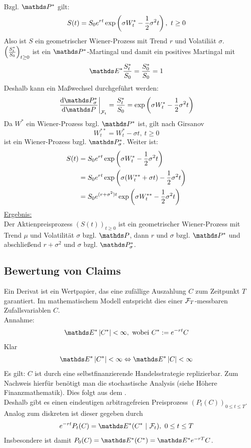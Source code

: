 \\
Bzgl. $\Pw^*$ gilt:
\[
S(t)=S_0 e^{r t}\exp\left( \sigma W_t^*-\frac{1}{2}\sigma^2t\right),~t\ge 0
\]
Also ist $S$ ein geometrischer Wiener-Prozess mit Trend $r$ und Volatiliät $\sigma$.\\
$\left( \frac{S_t^*}{S_0}\right)_{t\ge0}$ ist ein $\Pw^*$-Martingal und damit ein positives Martingal mit
\[
\E^*\frac{S_t^*}{S_0}=\frac{S_0^*}{S_0}=1
\]
Deshalb kann ein Maßwechsel durchgeführt werden:
\[
\left.\difff{\Pw_\sigma^*}{\Pw}\right|_{\F_t}=\frac{S_t^*}{S_0}=\exp\enbrace{\sigma W_t^*-\frac{1}{2}\sigma^2t}
\]
Da $W^*$ ein Wiener-Prozess bzgl. $\Pw^*$ ist, gilt nach Girsanov
\[
W_t^{**}=W_t^*-\sigma t,~t\ge0
\]
ist ein Wiener-Prozess bzgl. $\Pw_\sigma^*$.
Weiter ist:
\begin{equation*}
\begin{aligned}
	S(t)&= S_0 e^{r t}\exp\left( \sigma W_t^*-\frac{1}{2}\sigma^2t\right)\\
	&= S_0 e^{rt}\exp\left( \sigma(W_t^{**}+\sigma t)-\frac{1}{2}\sigma^2t\right)\\
	&= S_0 e^{(r+\sigma^2)t}\exp\left( \sigma W_t^{**}-\frac{1}{2}\sigma^2t\right)
\end{aligned}
\end{equation*}
\uline{Ergebnis:}\\
Der Aktienpreisprozess $(S(t))_{t\ge0}$ ist ein geometrischer Wiener-Prozess mit Trend $\mu$ und Volatilität $\sigma$ bzgl. $\Pw$, dann $r$ und $\sigma$ bzgl. $\Pw^*$ und abschließend $r+\sigma^2$ und $\sigma$ bzgl. $\Pw_\sigma^*$. 

\subsection{Bewertung von Claims}
\label{sub:bewertung_claims}
Ein Derivat ist ein Wertpapier, das eine zufällige Auszahlung $C$ zum Zeitpunkt $T$ garantiert.
Im mathematischem Modell entspricht dies einer $\mathcal{F}_T$-messbaren Zufallsvariablen $C$.\\
Annahme:
\[
\E^*\abs{C^*}<\infty, \text{ wobei } C^*:=e^{-rt}C
\]
Klar
\[
\E^*\abs{C^*}<\infty \Leftrightarrow \E^*\abs{C}<\infty
\]
Es gilt:
$C$ ist durch eine selbstfinanzierende Handelsstrategie replizierbar.
Zum Nachweis hierfür benötigt man die stochastische Analysis (siehe Höhere Finanzmathematik).
Dies folgt aus dem .\\
Deshalb gibt es einen eindeutigen arbitragefreien Preisprozess $(P_t(C))_{0\le t\le T}$.
Analog zum diskreten ist dieser gegeben durch
\[
e^{-rt} P_t(C)= \E^*(C^*~|~\F_t),~0\le t\le T
\]
Insbesondere ist damit $P_0(C)=\E^*(C^*)=\E^*e^{-rT}C$.

